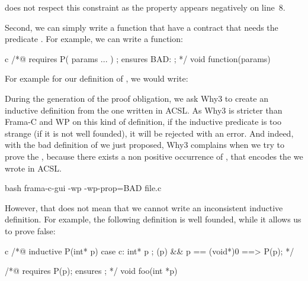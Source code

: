 
does not respect this constraint as the property 
appears negatively on line~8.

Second, we can simply write a function that have a contract that needs the
predicate . For example, we can write a function:



\begin{CodeBlock}{c}
/*@
  requires P( params ... ) ;
  ensures  BAD: \false ;
*/ void function(params){

}
\end{CodeBlock}



For example for our definition of , we would write:






During the generation of the proof obligation, we ask Why3 to create an
inductive definition from the one written in ACSL. As Why3 is stricter than
Frama-C and WP on this kind of definition, if the inductive predicate is too
strange (if it is not well founded), it will be rejected with an error. And
indeed, with the bad definition of  we just proposed,
Why3 complains when we try to prove the
, because there exists a non
positive occurrence of , that encodes the
 we wrote in ACSL.

\begin{CodeBlock}{bash}
frama-c-gui -wp -wp-prop=BAD file.c
\end{CodeBlock}





However, that does not mean that we cannot write an inconsistent inductive
definition. For example, the following definition is well founded, while it
allows us to prove false:


\begin{CodeBlock}{c}
/*@ inductive P(int* p){
      case c: \forall int* p ; \valid(p) && p == (void*)0 ==> P(p);
    }
*/

/*@ requires P(p);
    ensures \false ; */
void foo(int *p){}
\end{CodeBlock}


